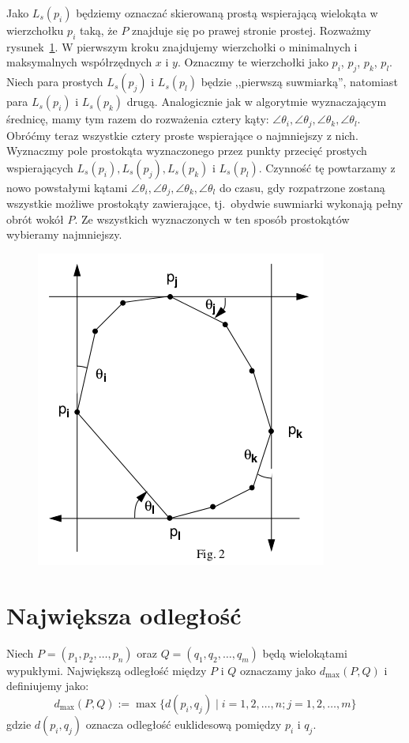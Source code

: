 Jako $L_s(p_i)$ będziemy oznaczać skierowaną prostą wspierającą
wielokąta w wierzchołku $p_i$ taką, że $P$ znajduje się po prawej
stronie prostej. Rozważmy rysunek~\ref{img:calipers2}. W pierwszym
kroku znajdujemy wierzchołki o minimalnych i maksymalnych
współrzędnych $x$ i $y$. Oznaczmy te wierzchołki jako $p_i$, $p_j$,
$p_k$, $p_l$. Niech para prostych $L_s(p_j)$ i $L_s(p_l)$ będzie
,,pierwszą suwmiarką'', natomiast para $L_s(p_i)$ i $L_s(p_k)$
drugą. Analogicznie jak w algorytmie wyznaczającym średnicę, mamy tym
razem do rozważenia cztery kąty: $\angle{\theta_i}, \angle{\theta_j},
\angle{\theta_k}, \angle{\theta_l}$. Obróćmy teraz wszystkie cztery
proste wspierające o najmniejszy z nich. Wyznaczmy pole prostokąta
wyznaczonego przez punkty przecięć prostych wspierających $L_s(p_i),
L_s(p_j), L_s(p_k)$ i $L_s(p_l)$. Czynność tę powtarzamy z nowo
powstałymi kątami $\angle{\theta_i}, \angle{\theta_j},
\angle{\theta_k}, \angle{\theta_l}$ do czasu, gdy rozpatrzone zostaną
wszystkie możliwe prostokąty zawierające, tj.\ obydwie suwmiarki
wykonają pełny obrót wokół $P$. Ze wszystkich wyznaczonych w ten
sposób prostokątów wybieramy najmniejszy.

\begin{figure}[htb]
  \centering
  \includegraphics[scale=0.5]{img/calipers2}
  \caption{\label{img:calipers2}}
\end{figure}

\section{Największa odległość\label{sec:max_dist}}
\begin{problem}
  Niech $P = (p_1, p_2, \ldots, p_n)$ oraz $Q = (q_1, q_2, \ldots,
  q_m)$ będą wielokątami wypukłymi. Największą odległość między $P$ i
  $Q$ oznaczamy jako $d_{\max}(P, Q)$ i definiujemy
  jako: $$d_{\max}(P, Q) := \max{\{ d(p_i, q_j) \mid i = 1, 2, \ldots,
    n; j = 1, 2, \ldots, m \}}$$ gdzie $d(p_i, q_j)$ oznacza odległość
  euklidesową pomiędzy $p_i$ i $q_j$.
\end{problem}

